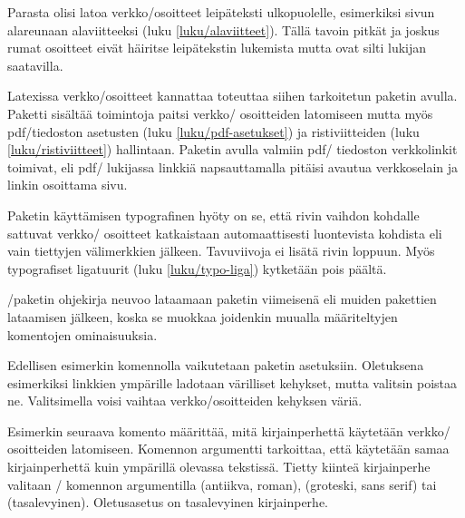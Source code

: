 Parasta olisi latoa verkko\-/osoitteet leipäteksti ulkopuolelle,
esimerkiksi sivun alareunaan alaviitteeksi (luku
\ref{luku/alaviitteet}). Tällä tavoin pitkät ja joskus rumat osoitteet
eivät häiritse leipätekstin lukemista mutta ovat silti lukijan
saatavilla.

Latexissa verkko\-/osoitteet kannattaa toteuttaa siihen tarkoitetun
paketin avulla. Paketti  sisältää toimintoja
paitsi verkko\-/ osoitteiden latomiseen mutta myös pdf\-/tiedoston
asetusten (luku \ref{luku/pdf-asetukset}) ja ristiviitteiden (luku
\ref{luku/ristiviitteet}) hallintaan. Paketin avulla valmiin pdf\-/
tiedoston verkkolinkit toimivat, eli pdf\-/ lukijassa linkkiä
napsauttamalla pitäisi avautua verkkoselain ja linkin osoittama sivu.

Paketin käyttämisen typografinen hyöty on se, että rivin vaihdon
kohdalle sattuvat verkko\-/ osoitteet katkaistaan automaattisesti
luontevista kohdista eli vain tiettyjen välimerkkien jälkeen.
Tavuviivoja ei lisätä rivin loppuun. Myös typografiset ligatuurit (luku
\ref{luku/typo-liga}) kytketään pois päältä.

\-/paketin ohjekirja neuvoo lataamaan paketin
viimeisenä eli muiden pakettien lataamisen jälkeen, koska se
muokkaa joidenkin muualla määriteltyjen komentojen ominaisuuksia.

\begin{koodilohkosis}
\usepackage{hyperref}  %
\hypersetup{hidelinks} %
\end{koodilohkosis}

\noindent
Edellisen esimerkin komennolla  vaikutetaan
paketin asetuksiin. Oletuksena esimerkiksi linkkien ympärille
ladotaan värilliset kehykset, mutta valitsin  poistaa
ne. Valitsimella  voisi vaihtaa verkko\-/osoitteiden
kehyksen väriä.

Esimerkin seuraava komento  määrittää, mitä
kirjainperhettä käytetään verkko\-/ osoitteiden latomiseen. Komennon
argumentti  tarkoittaa, että käytetään samaa kirjainperhettä
kuin ympärillä olevassa tekstissä. Tietty kiinteä kirjainperhe valitaan
\-/ komennon argumentilla  (antiikva,
roman),  (groteski, sans serif) tai  (tasalevyinen).
Oletusasetus on tasalevyinen kirjainperhe.

